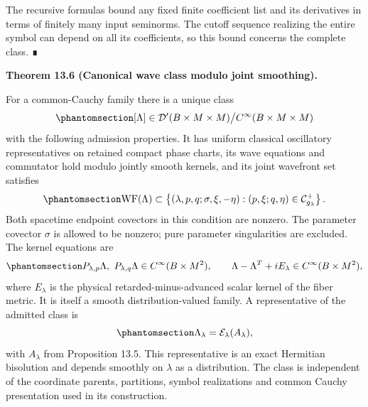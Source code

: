 \documentclass[
  english,
  11pt,
  reqno]{amsart}
\makeatletter
\newcommand{\pandocstatementheading}[1]{%
  \par\if@nobreak\else
    \addpenalty{\@beginparpenalty}%
    \addvspace{.5\baselineskip plus .2\baselineskip minus .2\baselineskip}%
  \fi
  {\normalfont\bfseries #1\par}%
  \nobreak\@afterindenttrue\@afterheading
}
\makeatother
\begin{document}
The recursive formulas bound any fixed finite coefficient list and its
derivatives in terms of finitely many input seminorms. The cutoff
sequence realizing the entire symbol can depend on all its coefficients,
so this bound concerns the complete class. ∎

\pandocstatementheading{\protect{}\label{thm:family-global-canonical-wave}Theorem 13.6 (Canonical wave class modulo joint smoothing).}

For a common-Cauchy family there is a unique class
\begin{equation}\protect\phantomsection\label{eq:family-global-wave-class}{
[\Lambda]\in
\mathcal D'(B\times M\times M)\big/
C^\infty(B\times M\times M)
}\end{equation} with the following admission properties. It has uniform
classical oscillatory representatives on retained compact phase charts,
its wave equations and commutator hold modulo jointly smooth kernels,
and its joint wavefront set satisfies
\begin{equation}\protect\phantomsection\label{eq:family-global-joint-positive-relation}{
\operatorname{WF}(\Lambda)\subset
\left\{(\lambda,p,q;\sigma,\xi,-\eta):
(p,\xi;q,\eta)\in\mathcal C_{g_\lambda}^+\right\}.
}\end{equation} Both spacetime endpoint covectors in this condition are
nonzero. The parameter covector \(\sigma\) is allowed to be nonzero;
pure parameter singularities are excluded. The kernel equations are
\begin{equation}\protect\phantomsection\label{eq:family-global-wave-admission}{
P_{\lambda,p}\Lambda,\ P_{\lambda,q}\Lambda
\in C^\infty(B\times M^2),
\qquad
\Lambda-\Lambda^T+iE_\lambda
\in C^\infty(B\times M^2),
}\end{equation} where \(E_\lambda\) is the physical
retarded-minus-advanced scalar kernel of the fiber metric. It is itself
a smooth distribution-valued family. A representative of the admitted
class is
\begin{equation}\protect\phantomsection\label{eq:family-global-wave-construction}{
\Lambda_\lambda=\mathcal E_\lambda(A_\lambda),
}\end{equation} with \(A_\lambda\) from Proposition 13.5. This
representative is an exact Hermitian bisolution and depends smoothly on
\(\lambda\) as a distribution. The class is independent of the
coordinate parents, partitions, symbol realizations and common Cauchy
presentation used in its construction.
\end{document}
